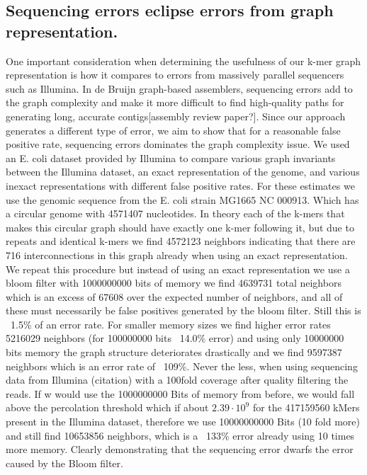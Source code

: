 \documentclass[12pt]{article} \usepackage{simplemargins}
\begin{document}
\subsection{Sequencing errors eclipse errors from graph representation.} One
important consideration when determining the usefulness of our k-mer
graph representation is how it compares to errors from massively
parallel sequencers such as Illumina. In de Bruijn graph-based
assemblers, sequencing errors add to the graph complexity and make it
more difficult to find high-quality paths for generating long,
accurate contigs[assembly review paper?]. Since our approach generates
a different type of error, we aim to show that for a reasonable false
positive rate, sequencing errors dominates the graph complexity
issue. We used an E. coli dataset provided by Illumina to compare
various graph invariants between the Illumina dataset, an exact
representation of the genome, and various inexact representations with
different false positive rates.
For these estimates we use the genomic sequence from the E. coli strain MG1665 NC 000913.
Which has a circular genome with 4571407 nucleotides. In theory each of the k-mers that makes this
circular graph should have exactly one k-mer following it, but due to repeats and identical
k-mers we find 4572123 neighbors indicating that there are 716 interconnections in this graph already
when using an exact representation. We repeat this procedure but instead of using an exact representation
we use a bloom filter with 1000000000 bits of memory we find 4639731 total neighbors which is an excess
of 67608 over the expected number of neighbors, and all of these must necessarily be false positives
generated by the bloom filter. Still this is ~1.5\% of an error rate. For smaller memory sizes we find higher
error rates 5216029 neighbors (for 100000000 bits ~14.0\% error) and using only 10000000 bits memory the graph
structure deteriorates drastically and we find 9597387 neighbors which is an error rate of ~109\%.
Never the less, when using sequencing data from Illumina (citation) with a 100fold coverage after quality filtering
the reads. If w would use the 1000000000 Bits of memory from before, we would fall above the percolation threshold which
if about $2.39 \cdot 10^9$ for the 417159560 kMers present in the Illumina dataset, therefore we 
use 10000000000 Bits (10 fold more)
and still find 10653856 neighbors, which is a ~133\% error already using 10 times more memory. Clearly demonstrating that
the sequencing error dwarfs the error caused by the Bloom filter.
\end{document}

